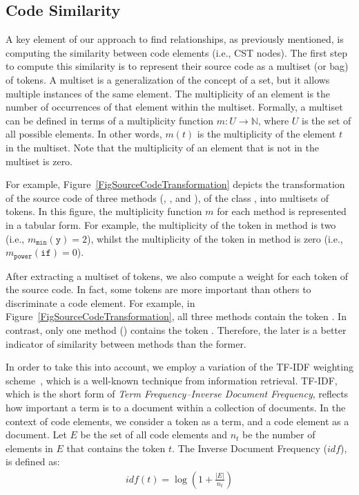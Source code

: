 \subsection{Code Similarity}
\label{SecCodeSim}



A key element of our approach to find relationships, as previously mentioned, is computing the similarity between code elements (i.e., CST nodes).
The first step to compute this similarity is to represent their source code as a multiset (or bag) of tokens.
A multiset is a generalization of the concept of a set, but it allows multiple instances of the same element.
The multiplicity of an element is the number of occurrences of that element within the multiset. Formally, a multiset can be defined in terms of a multiplicity function $m: U \to \mathbb{N}$, where $U$ is the set of all possible elements. In other words, $m(t)$ is the multiplicity of the element $t$ in the multiset. Note that the multiplicity of an element that is not in the multiset is zero.

For example, Figure~\ref{FigSourceCodeTransformation} depicts the transformation of the source code of three methods (, , and ), of the class , into multisets of tokens. In this figure, the multiplicity function $m$ for each method is represented in a tabular form. For example, the multiplicity of the token  in method  is two (i.e., $m_{\mathtt{min}}(\mathtt{y}) = 2$), whilst the multiplicity of the token  in method  is zero (i.e., $m_{\mathtt{power}}(\mathtt{if}) = 0$).

After extracting a multiset of tokens, we also compute a weight for each token
of the source code.
In fact, some tokens are more important than others to discriminate a code element.
For example, in Figure~\ref{FigSourceCodeTransformation}, all three methods contain the token . In contrast, only one method () contains the token . Therefore, the later is a better indicator of similarity between methods than the former.

In order to take this into account, we employ a variation of the TF-IDF weighting scheme~\cite{salton1986introduction}, which is a well-known technique from information retrieval.
TF-IDF, which is the short form of \emph{Term Frequency–Inverse Document Frequency}, reflects how important a term is to a document within a collection of documents.
In the context of code elements, we consider a token as a term, and a code element as a document.
Let $E$ be the set of all code elements and $n_t$ be the number of elements in $E$ that contains the token $t$. The Inverse Document Frequency ($\mathit{idf}$), is defined as:
\begin{align}
\mathit{idf}(t) = \log (1 + \frac{|E|}{n_t})
\end{align}

